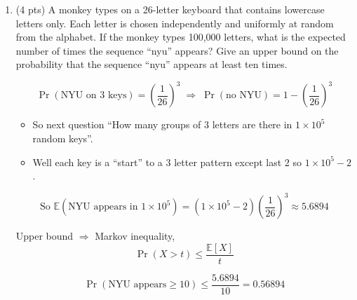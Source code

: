 \documentclass[11pt]{article}
\begin{document}
\begin{enumerate}[label=\arabic*.]
	\[
	\Pr(h(x)=h(y))=\frac{1}{n}
	\;\;\Rightarrow\;\;
	\Pr(h(x)\neq h(y))=1-\frac{1}{n}
	\]

	\[
	\Pr(\text{no collision})
	=
	\prod_{i=1}^{m-1}\left(1-\frac{i}{n}\right)
	\]

	\[
	\ge
	\left(1-\frac{m}{n}\right)^m
	\]

	So
	\[
	\left(1-\frac{m}{n}\right)^m
	=
	\left(1-\frac{m}{c m^2}\right)^m
	=
	\left(1-\frac{1}{c m}\right)^m
	=
	\left(\left(1-\frac{1}{c m}\right)^{c m}\right)^{\frac{1}{c}}
	\]

	\[
	1-x \le e^{-x}
	\;\;\Leftrightarrow\;\;
	\frac{1}{2e}\le \left(1-\frac{1}{x}\right)^x \le \frac{1}{e},
	\qquad x=c m
	\]

	So
	\[
	\left(\left(1-\frac{1}{c m}\right)^{c m}\right)^{\frac{1}{c}}
	\ge
	\left(\frac{1}{2e}\right)^{\frac{1}{c}}
	\;\;\Rightarrow\;\;
	\Pr(\text{no collision}) \ge \left(\frac{1}{2e}\right)^{\frac{1}{c}}
	\]

	So
	\[
	\left(\frac{1}{2e}\right)^{\frac{1}{c}} \ge \frac{9}{10}
	\]

	\[
	\frac{1}{c}\ln\!\left(\frac{1}{2e}\right) \ge \ln\!\left(\frac{9}{10}\right)
	\]

	\[
	c \ge \frac{\ln(2e)}{\ln(10/9)} \approx 16.07
	\]

	If
	\[
	c > 16.07
	\quad\text{then}\quad
	\Pr(\text{no collision}) \ge \frac{9}{10}.
	\]

	\item (4 pts) A monkey types on a 26-letter keyboard that contains lowercase letters only. Each letter is chosen independently and uniformly at random from the alphabet. If the monkey types 100,000 letters, what is the expected number of times the sequence ``nyu'' appears? Give an upper bound on the probability that the sequence ``nyu'' appears at least ten times.

\[
\Pr(\text{NYU on 3 keys})=\left(\frac{1}{26}\right)^3
\;\Rightarrow\;
\Pr(\text{no NYU}) = 1-\left(\frac{1}{26}\right)^3
\]

\begin{itemize}
	\item So next question ``How many groups of 3 letters are there in $1\times 10^5$ random keys''. 
	\item Well each key is a ``start'' to a 3 letter pattern except last 2
	so $1\times 10^5 - 2$.
\end{itemize}

\[
\text{So } \mathbb{E}(\text{NYU appears in }1\times 10^5)
=
(1\times 10^5 - 2)\left(\frac{1}{26}\right)^3
\approx 5.6894
\]

Upper bound $\Rightarrow$ Markov inequality,
\[
\Pr(X>t)\le \frac{\mathbb{E}[X]}{t}
\]

\[
\Pr(\text{NYU appears} \ge 10)
\le
\frac{5.6894}{10}
=
0.56894
\]
\end{enumerate}
\end{document}
